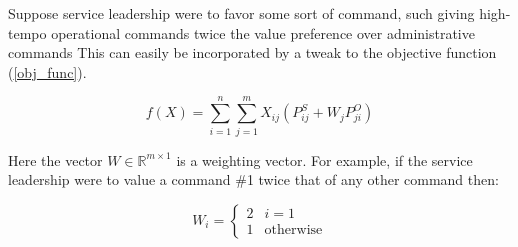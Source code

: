 Suppose service leadership were to favor some sort of command, such giving high-tempo operational commands twice the value preference over administrative commands This can easily be incorporated by a tweak to the objective function (\ref{obj_func}). 

\[f(X) = \sum_{i=1}^n \sum_{j=1}^m X_{ij}(P^S_{ij} + W_jP^O_{ji})\]

Here the vector $W \in \mathbb{R}^{m \times 1}$ is a weighting vector. For example, if the service leadership were to value a command \#1 twice that of any other command then:

\[ W_i = \begin{cases} 2 & i = 1\\ 1 & \text{otherwise} \end{cases}\] 
